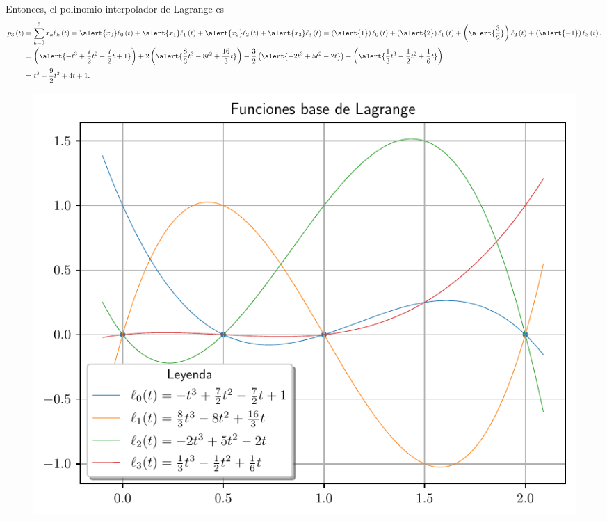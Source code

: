 \begin{frame}
	\begin{solution}
		Entonces, el polinomio interpolador de Lagrange es
		\begin{align*}
			p_{3}\left(t\right) & =
			\sum\limits_{k=0}^{3}
			x_{k}
			\ell_{k}\left(t\right)=
			\alert{x_{0}}
			\ell_{0}\left(t\right)+
			\alert{x_{1}}
			\ell_{1}\left(t\right)+
			\alert{x_{2}}
			\ell_{2}\left(t\right)+
			\alert{x_{3}}
			\ell_{3}\left(t\right)=
			\left(
			\alert{1}
			\right)
			\ell_{0}
			\left(t\right)+
			\left(
			\alert{2}
			\right)
			\ell_{1}\left(t\right)+
			\left(
			\alert{\dfrac{3}{2}}
			\right)
			\ell_{2}\left(t\right)+
			\left(
			\alert{-1}
			\right)
			\ell_{3}\left(t\right). \\
			                    & =
			\left(
			\alert{
				-t^{3}+\dfrac{7}{2}t^{2}-\dfrac{7}{2}t+1
			}
			\right)+
			2
			\left(
			\alert{
				\dfrac{8}{3}t^{3}-8t^{2}+\dfrac{16}{3}t
			}
			\right)-
			\dfrac{3}{2}
			\left(
			\alert{
				-2t^{3}+5t^{2}-2t
			}
			\right)-
			\left(
			\alert{
				\dfrac{1}{3}t^{3}-\dfrac{1}{2}t^{2}+\dfrac{1}{6}t
			}
			\right)                 \\
			                    & =
			t^{3}-\dfrac{9}{2}t^{2}+4t+1.
		\end{align*}
	\end{solution}
\end{frame}

\begin{frame}
	\begin{solution}
		\begin{figure}[ht!]
			\centering
			\includegraphics[width=.72\paperwidth]{p7_lagrange}
		\end{figure}
	\end{solution}
\end{frame}


